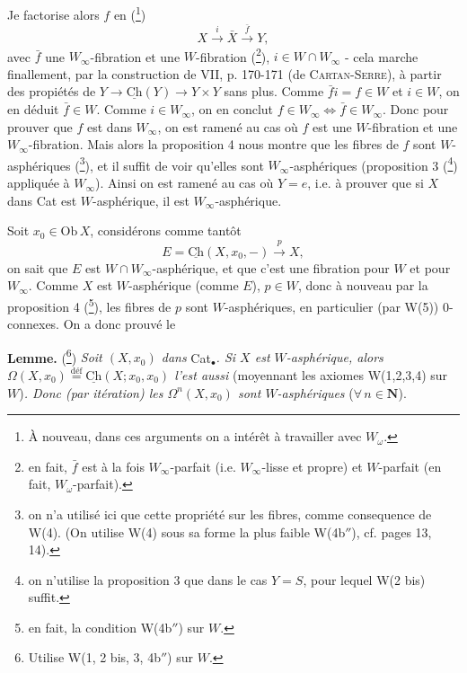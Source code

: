\documentclass[11pt]{article}
\newcommand{\printedpage}[1]{\marginpar{\footnotesize p.~#1}}
\newcommand{\msp}[1]{\marginpar{\footnotesize [#1]}}
\newcommand{\Ch}{\underline{\mathrm{Ch}}}
\begin{document}
\msp{page 11}Je factorise alors $f$ en (\footnote[19]{À nouveau, dans ces arguments on a intérêt à travailler avec $W_\omega$.})
\[ X \xrightarrow{i} \bar{X} \xrightarrow{\bar{f}} Y, \]
avec $\bar{f}$ une $W_\infty$-fibration et une $W$-fibration (\footnote[20]{en fait, $\bar{f}$ est à la fois $W_\infty$-parfait (i.e. $W_\infty$-lisse et propre) et $W$-parfait (en fait, $W_\omega$-parfait).}), $i \in W \cap W_\infty$ - cela marche finallement, %
par la construction de VII, p. 170-171 (de \textsc{Cartan-Serre}), à partir des propiétés de %
$Y \longrightarrow \Ch(Y) \longrightarrow Y \times Y$ sans plus. Comme $\bar{f} i = f \in W$ et $i \in W$, on en déduit $\bar{f} \in W$. Comme $i \in W_\infty$, on en conclut $f \in W_\infty \iff \bar{f} \in W_\infty$. Donc pour prouver que $f$ est dans $W_\infty$, on est ramené au cas où $f$ est une $W$-fibration et une $W_\infty$-fibration. Mais alors la proposition 4 nous montre que les fibres de $f$ sont $W$-asphériques (\footnote[21]{on n'a utilisé ici que cette propriété sur les fibres, comme consequence de W(4). (On utilise W(4) sous sa forme la plus faible W(4b$''$), cf. pages 13, 14).}), et il suffit de voir qu'elles sont $W_\infty$-asphériques (proposition 3 (\footnote[22]{on n'utilise la proposition 3 que dans le cas $Y = S$, pour lequel W(2 bis) suffit.}) appliquée à $W_\infty$). Ainsi on est ramené au cas où $Y = e$, i.e. à prouver que si $X$ dans Cat est $W$-asphérique, il est $W_\infty$-asphérique.

Soit $x_0 \in \mathrm{Ob}\, X$, considérons comme tantôt
\[ E = \Ch(X, x_0, -) \xrightarrow{p} X, \]
\printedpage{10}
on sait que $E$ est $W \cap W_\infty$-asphérique, et que c'est une fibration pour $W$ et pour $W_\infty$. Comme $X$ est $W$-asphérique (comme $E$), $p \in W$, donc à nouveau par la proposition 4 (\footnote[23]{en fait, la condition W(4b$''$) sur $W$.}), les fibres de $p$ sont $W$-asphériques, en particulier (par W(5)) 0-connexes. On a donc prouvé le

\msp{page 12}\textbf{Lemme.} (\footnote[24]{Utilise W(1, 2 bis, 3, 4b$''$) sur $W$.}) \textit{Soit $(X, x_0)$ dans} Cat$_\bullet$\textit{. Si $X$ est $W$-asphérique, alors $\Omega(X, x_0) \overset{\text{déf}}{=} \Ch(X; x_0, x_0)$ l'est aussi} (moyennant les axiomes W(1,2,3,4) sur $W$)\textit{. Donc (par itération) les $\Omega^n(X, x_0)$ sont $W$-asphériques} ($\forall\, n \in \mathbf{N}$).
\end{document}
